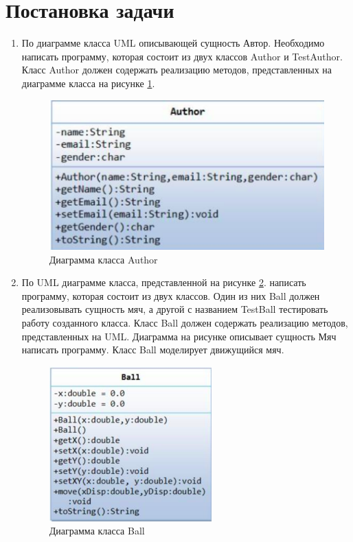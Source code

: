 \documentclass[14pt, a4paper]{extarticle}
\begin{document}
\section*{Постановка задачи}
\begin{enumerate}
\item По диаграмме класса UML описывающей сущность Автор.
Необходимо написать программу, которая состоит из двух классов Author
и TestAuthor. Класс Author должен содержать реализацию методов,
представленных на диаграмме класса на рисунке \ref{fig:uml-task1}.
\begin{figure}[H]
\centering
\includegraphics{uml-task1}
\caption{Диаграмма класса Author}\label{fig:uml-task1}
\end{figure}
\item По UML диаграмме класса, представленной на рисунке \ref{fig:uml-task2}.
написать программу, которая состоит из двух классов. Один из них Ball
должен реализовывать сущность мяч, а другой с названием TestBall
тестировать работу созданного класса. Класс Ball должен содержать
реализацию методов, представленных на UML. Диаграмма на рисунке
описывает сущность Мяч написать программу. Класс Ball моделирует
движущийся мяч.
\begin{figure}[H]
\centering
\includegraphics{uml-task2}
\caption{Диаграмма класса Ball}\label{fig:uml-task2}
\end{figure}

\end{enumerate}
\end{document}
